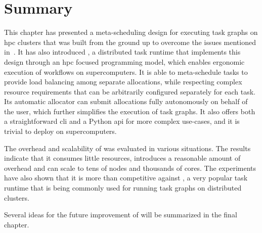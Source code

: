 \section*{Summary}
This chapter has presented a meta-scheduling design for executing task graphs on
\gls{hpc} clusters that was built from the ground up to overcome the issues mentioned
in~. It has also introduced \hyperqueue{}, a distributed task
runtime that implements this design through an \gls{hpc} focused programming model,
which enables ergonomic execution of workflows on supercomputers. It is able to meta-schedule tasks
to provide load balancing among separate allocations, while respecting complex resource
requirements that can be arbitrarily configured separately for each task. Its automatic allocator
can submit allocations fully autonomously on behalf of the user, which further simplifies the
execution of \hyperqueue{} task graphs. It also offers both a straightforward
\gls{cli} and a Python \gls{api} for more complex use-cases, and it is
trivial to deploy on supercomputers.

The overhead and scalability of \hyperqueue{} was evaluated in various situations. The
results indicate that it consumes little resources, introduces a reasonable amount of overhead and
can scale to tens of nodes and thousands of cores. The experiments have also shown that it is more
than competitive against \dask{}, a very popular task runtime that is being
commonly used for running task graphs on distributed clusters.

Several ideas for the future improvement of \hyperqueue{} will be summarized in the final
chapter.
